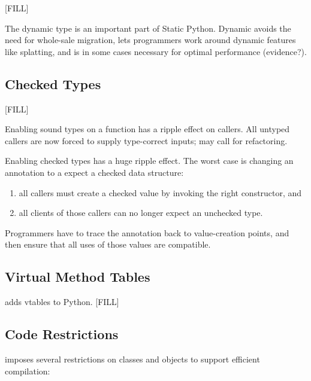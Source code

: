 \documentclass[a4paper,english,cleveref,autoref,thm-restate,anonymous,]{lipics-v2021}
\begin{document}
[FILL]

The dynamic type is an important part of Static Python.
Dynamic avoids the need for whole-sale migration,
lets programmers work around dynamic features like splatting,
and is in some cases necessary for optimal performance (evidence?).


\subsection{Checked Types}

[FILL]

Enabling sound types on a function has a ripple effect on callers.
All untyped callers are now forced to supply type-correct inputs; may call for
refactoring.

Enabling checked types has a huge ripple effect.
The worst case is changing an annotation to a expect a checked data structure:
\begin{enumerate}
  \item all callers must create a checked value by invoking the right constructor, and
  \item all clients of those callers can no longer expect an unchecked type.
\end{enumerate}
Programmers have to trace the annotation back to value-creation points, and then
ensure that all uses of those values are compatible.


\subsection{Virtual Method Tables}

\SP{} adds vtables to Python.
[FILL]



\subsection{Code Restrictions}

\SP{} imposes several restrictions on classes and objects
to support efficient compilation:
\end{document}
